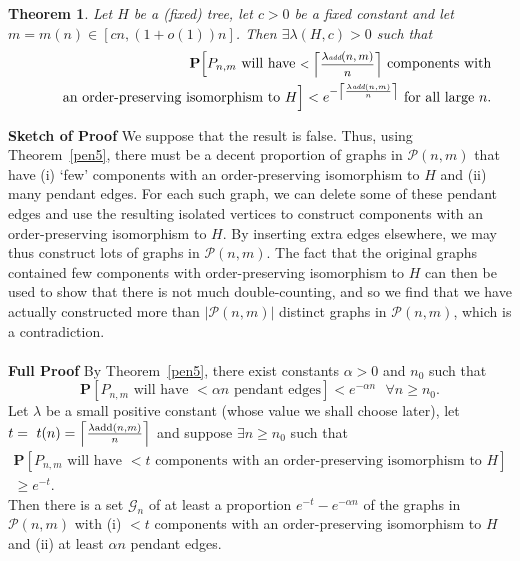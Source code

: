 \documentclass{article}
\newtheorem{Theorem}{Theorem}
\newtheorem{Proof of Theorem}{Proof of Theorem}
\begin{document}
\begin{Theorem} \label{tree4}
Let $H$ be a (fixed) tree, let $c>0$ be a fixed constant
and let $m=m(n) \in [cn, (1+o(1))n]$.
Then $\exists \lambda (H,c) > 0$ such that
\begin{eqnarray*}
& & \mathbf{P}\Big[
\textrm{$P_{n,m}$
will have \footnotesize{$< \left \lceil \frac{\lambda \emph{\tiny{add}}(n,m)}{n} \right \rceil$}} 
\textrm{ components with} \\
& & \phantom{ww}\textrm{an order-preserving isomorphism to $H$}\Big] 
< e^{- \left \lceil \frac{\lambda \emph{\tiny{add}}(n,m)}{n} \right \rceil} \textrm{ for all large $n$}.
\end{eqnarray*}
\end{Theorem}
\textbf{Sketch of Proof}
We suppose that the result is false.
Thus, using Theorem~\ref{pen5},
there must be a decent proportion of graphs in $\mathcal{P}(n,m)$ that have
(i) `few' components with an order-preserving isomorphism to $H$
and (ii) many pendant edges.
For each such graph, 
we can delete some of these pendant edges and
use the resulting isolated vertices to construct components with an order-preserving isomorphism to $H$.
By inserting extra edges elsewhere,
we may thus construct lots of graphs in $\mathcal{P}(n,m)$.
The fact that the original graphs contained 
few components with order-preserving isomorphism to $H$
can then be used to show that there is not much double-counting,
and so we find that we have actually constructed more than $|\mathcal{P}(n,m)|$ distinct graphs in $\mathcal{P}(n,m)$,
which is a contradiction. \\
\\
\textbf{Full Proof} 
By Theorem~\ref{pen5}, there exist constants $\alpha >0$ and $n_{0}$ such that 
\begin{displaymath}
\mathbf{P}[P_{n,m} \textrm{ will have } < \alpha n \textrm{ pendant edges}] < e^{- \alpha n} 
\textrm{ } \forall n \geq n_{0}.
\end{displaymath}
Let $\lambda$ be a small positive constant (whose value we shall choose later),
let $t=~t(n)= \left \lceil \frac{\lambda \textrm{\scriptsize{add}}(n,m)}{n} \right \rceil$
and suppose $\exists n \geq n_{0}$ such that 
\begin{eqnarray*}
\mathbf{P}[P_{n,m} 
\textrm{ will have $<t$ 
components with an order-preserving isomorphism to } H] \\
\geq e^{-t}.
\end{eqnarray*}
Then there is a set $\mathcal{G}_{n}$ of at least a proportion 
$e^{-t} - e^{- \alpha n}$ of the graphs in 
$\mathcal{P}(n,m)$ 
with (i) $<t$ components with an order-preserving isomorphism to $H$ and (ii) at least $\alpha n$ pendant edges.
\end{document}

